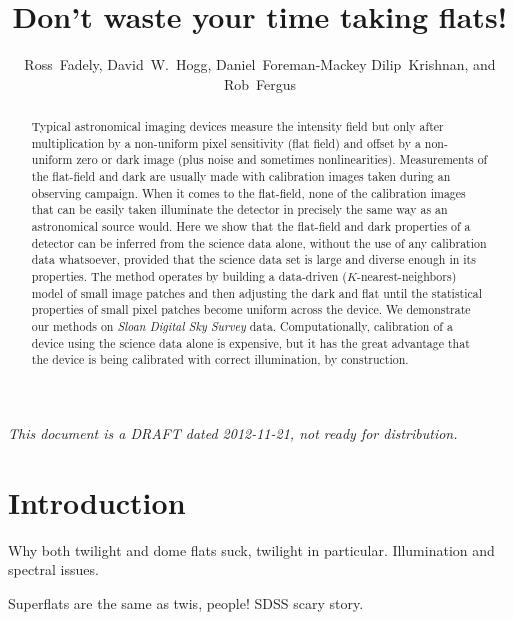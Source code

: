 \documentclass[12pt,preprint,pdftex]{aastex}
\newcommand{\project}[1]{\textsl{#1}}
\begin{document}
\title{Don't waste your time taking flats!}
\author{
  Ross~Fadely,
  David~W.~Hogg,
  Daniel~Foreman-Mackey
  Dilip~Krishnan, and
  Rob~Fergus
}

\begin{abstract}
Typical astronomical imaging devices measure the intensity field but
only after multiplication by a non-uniform pixel sensitivity (flat
field) and offset by a non-uniform zero or dark image (plus noise and
sometimes nonlinearities).  Measurements of the flat-field and dark
are usually made with calibration images taken during an observing
campaign.  When it comes to the flat-field, none of the calibration
images that can be easily taken illuminate the detector in precisely
the same way as an astronomical source would.  Here we show that the
flat-field and dark properties of a detector can be inferred from the
science data alone, without the use of any calibration data
whatsoever, provided that the science data set is large and diverse
enough in its properties.  The method operates by building a
data-driven ($K$-nearest-neighbors) model of small image patches and
then adjusting the dark and flat until the statistical properties of
small pixel patches become uniform across the device.  We demonstrate
our methods on \project{Sloan Digital Sky Survey} data.
Computationally, calibration of a device using the science data alone
is expensive, but it has the great advantage that the device is being
calibrated with correct illumination, by construction.
\end{abstract}

\noindent
\textsl{This document is a DRAFT dated 2012-11-21, not ready for distribution.}

\section{Introduction}

Why both twilight and dome flats suck, twilight in particular.  Illumination and spectral issues.

Superflats are the same as twis, people!  SDSS scary story.
\end{document}
